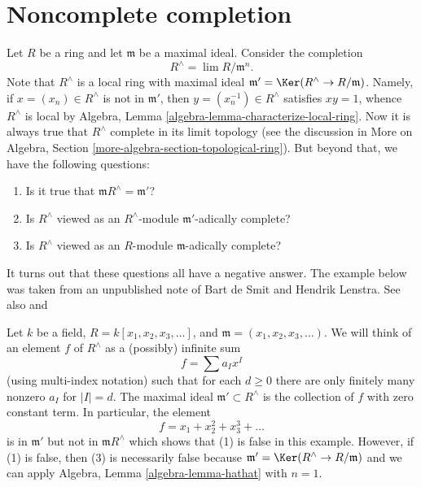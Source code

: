 \section{Noncomplete completion}
\label{section-noncomplete-completion}

\noindent
Let $R$ be a ring and let $\mathfrak m$ be a maximal ideal. Consider the
completion
$$
R^\wedge = \lim R/\mathfrak m^n.
$$
Note that $R^\wedge$ is a local ring with maximal ideal
$\mathfrak m' = \Ker(R^\wedge \to R/\mathfrak m)$.
Namely, if $x = (x_n) \in R^\wedge$ is not in $\mathfrak m'$, then
$y = (x_n^{-1}) \in R^\wedge$ satisfies $xy = 1$, whence $R^\wedge$ is local by
Algebra, Lemma \ref{algebra-lemma-characterize-local-ring}. Now it is
always true that $R^\wedge$ complete in its limit topology (see the
discussion in
More on Algebra, Section \ref{more-algebra-section-topological-ring}).
But beyond that, we have the following questions:
\begin{enumerate}
\item Is it true that $\mathfrak m R^\wedge = \mathfrak m'$?
\item Is $R^\wedge$ viewed as an $R^\wedge$-module $\mathfrak m'$-adically
complete?
\item Is $R^\wedge$ viewed as an $R$-module $\mathfrak m$-adically complete?
\end{enumerate}
It turns out that these questions all have a negative answer.
The example below was taken from an unpublished note of
Bart de Smit and Hendrik Lenstra. See also
\cite[Exercise III.2.12]{Bourbaki-CA} and
\cite[Example 1.8]{Yekutieli}

\medskip\noindent
Let $k$ be a field, $R = k[x_1, x_2, x_3, \ldots]$, and
$\mathfrak m = (x_1, x_2, x_3, \ldots)$.
We will think of an element $f$ of $R^\wedge$ as a (possibly) infinite sum
$$
f = \sum a_I x^I
$$
(using multi-index notation) such that for each $d \geq 0$ there
are only finitely many nonzero $a_I$ for $|I| = d$. The maximal
ideal $\mathfrak m' \subset R^\wedge$ is the collection of $f$ with
zero constant term. In particular, the element
$$
f = x_1 + x_2^2 + x_3^3 + \ldots
$$
is in $\mathfrak m'$ but not in $\mathfrak m R^\wedge$ which
shows that (1) is false in this example. However, if (1) is
false, then (3) is necessarily false because
$\mathfrak m' = \Ker(R^\wedge \to R/\mathfrak m)$
and we can apply
Algebra, Lemma \ref{algebra-lemma-hathat} with $n = 1$.


